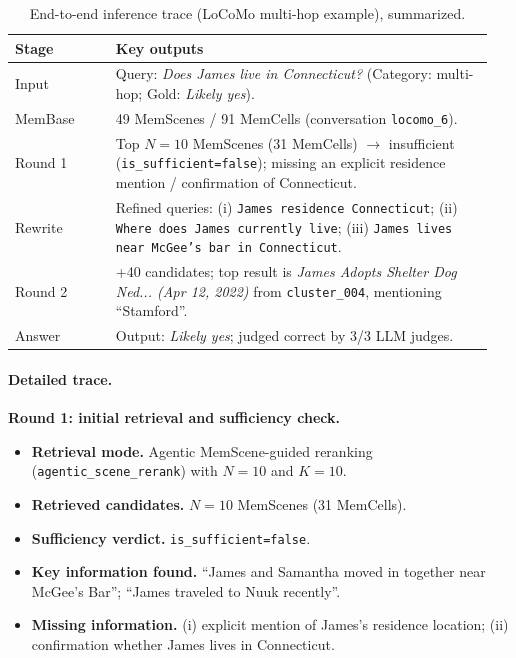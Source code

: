 \begin{table}[t]
\centering
\small
\setlength{\tabcolsep}{4pt}
\renewcommand{\arraystretch}{1.05}
\caption{End-to-end inference trace (LoCoMo multi-hop example), summarized.}
\label{tab:inference_trace_multihop}
\begin{tabular}{p{0.20\linewidth} p{0.75\linewidth}}
\toprule
\textbf{Stage} & \textbf{Key outputs} \\
\midrule
Input & Query: \emph{Does James live in Connecticut?} (Category: multi-hop; Gold: \emph{Likely yes}). \\
MemBase & 49 MemScenes / 91 MemCells (conversation \texttt{locomo\_6}). \\
Round 1 & Top \(N{=}10\) MemScenes (31 MemCells) $\rightarrow$ insufficient (\texttt{is\_sufficient=false}); missing an explicit residence mention / confirmation of Connecticut. \\
Rewrite & Refined queries: (i) \texttt{James residence Connecticut}; (ii) \texttt{Where does James currently live}; (iii) \texttt{James lives near McGee's bar in Connecticut}. \\
Round 2 & +40 candidates; top result is \emph{James Adopts Shelter Dog Ned... (Apr 12, 2022)} from \texttt{cluster\_004}, mentioning ``Stamford''. \\
Answer & Output: \emph{Likely yes}; judged correct by 3/3 LLM judges. \\
\bottomrule
\end{tabular}
\end{table}

\paragraph{Detailed trace.}
\noindent\textbf{Round 1: initial retrieval and sufficiency check.}
\begin{itemize}
\item \textbf{Retrieval mode.} Agentic MemScene-guided reranking (\texttt{agentic\_scene\_rerank}) with \(N{=}10\) and \(K{=}10\).
\item \textbf{Retrieved candidates.} \(N{=}10\) MemScenes (31 MemCells).
\item \textbf{Sufficiency verdict.} \texttt{is\_sufficient=false}.
\item \textbf{Key information found.} ``James and Samantha moved in together near McGee's Bar''; ``James traveled to Nuuk recently''.
\item \textbf{Missing information.} (i) explicit mention of James's residence location; (ii) confirmation whether James lives in Connecticut.
\end{itemize}

